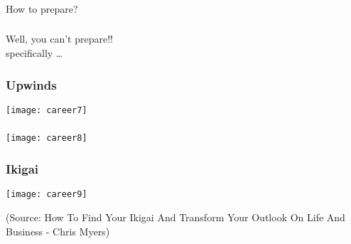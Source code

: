 \begin{frame}[fragile]\frametitle{}
	
	\begin{center}
	{\Large How to prepare?} 
	\end{center}

\end{frame}

\begin{frame}[fragile]\frametitle{}
	
	\begin{center}
	{\Large Well, you can’t prepare!!}  \\
	
	specifically \ldots
	\end{center}

\end{frame}

\begin{frame}[fragile]\frametitle{Upwinds}
	
	\begin{center}
	\texttt{[image: career7]}
	\end{center}

\end{frame}

\begin{frame}[fragile]\frametitle{}
	
	\begin{center}
	\texttt{[image: career8]}
	\end{center}

\end{frame}

\begin{frame}[fragile]\frametitle{Ikigai}
	
	\begin{center}
	\texttt{[image: career9]}
	\end{center}
	
	{\tiny (Source:  How To Find Your Ikigai And Transform Your Outlook On Life And Business - Chris Myers)}

\end{frame}

